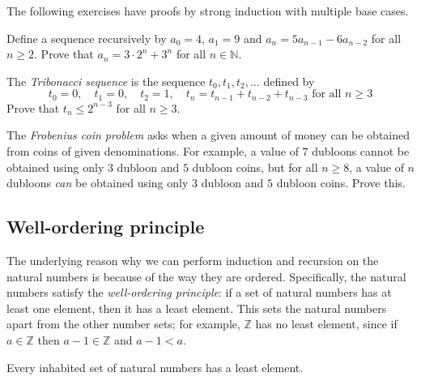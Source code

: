 The following exercises have proofs by strong induction with multiple base cases.

\begin{exercise}
Define a sequence recursively by $a_0 = 4$, $a_1 = 9$ and $a_n = 5a_{n-1} - 6a_{n-2}$ for all $n \ge 2$. Prove that $a_n = 3 \cdot 2^n + 3^n$ for all $n \in \mathbb{N}$.
\end{exercise}

\begin{exercise}
The \textit{Tribonacci sequence} is the sequence $t_0, t_1, t_2, \dots$ defined by
\[ t_0 = 0, \quad t_1 = 0, \quad t_2 = 1, \quad t_n = t_{n-1} + t_{n-2} + t_{n-3} \text{ for all } n \ge 3 \]
Prove that $t_n \le 2^{n-3}$ for all $n \ge 3$.
\end{exercise}

\begin{exercise}
The \textit{Frobenius coin problem} asks when a given amount of money can be obtained from coins of given denominations. For example, a value of $7$ dubloons cannot be obtained using only $3$ dubloon and $5$ dubloon coins, but for all $n \ge 8$, a value of $n$ dubloons \textit{can} be obtained using only $3$ dubloon and $5$ dubloon coins. Prove this.
\end{exercise}

\subsection*{Well-ordering principle}

The underlying reason why we can perform induction and recursion on the natural numbers is because of the way they are ordered. Specifically, the natural numbers satisfy the \textit{well-ordering principle}: if a set of natural numbers has at least one element, then it has a least element. This sets the natural numbers apart from the other number sets; for example, $\mathbb{Z}$ has no least element, since if $a \in \mathbb{Z}$ then $a-1 \in \mathbb{Z}$ and $a-1 < a$.

\begin{theorem}
\label{thmWellOrderingPrinciple}
Every inhabited set of natural numbers has a least element.
\end{theorem}

